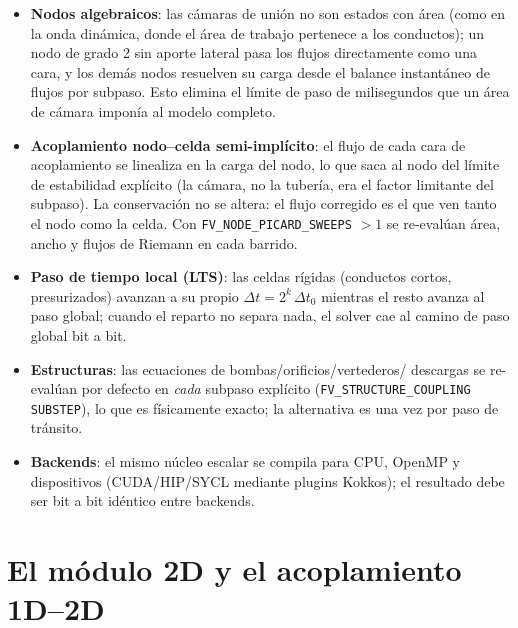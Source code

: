 \documentclass[11pt,a4paper]{article}
\begin{document}
\begin{itemize}[nosep]
  \item \textbf{Nodos algebraicos}: las cámaras de unión no son estados con
        área (como en la onda dinámica, donde el área de trabajo pertenece a
        los conductos); un nodo de grado 2 sin aporte lateral pasa los flujos
        directamente como una cara, y los demás nodos resuelven su carga desde
        el balance instantáneo de flujos por subpaso. Esto elimina el límite de
        paso de milisegundos que un área de cámara imponía al modelo completo.
  \item \textbf{Acoplamiento nodo--celda semi-implícito}: el flujo de cada cara
        de acoplamiento se linealiza en la carga del nodo, lo que saca al nodo
        del límite de estabilidad explícito (la cámara, no la tubería, era el
        factor limitante del subpaso). La conservación no se altera: el flujo
        corregido es el que ven tanto el nodo como la celda. Con
        \texttt{FV\_NODE\_PICARD\_SWEEPS} $> 1$ se re-evalúan área, ancho y
        flujos de Riemann en cada barrido.
  \item \textbf{Paso de tiempo local (LTS)}: las celdas rígidas (conductos
        cortos, presurizados) avanzan a su propio $\Delta t = 2^k\,\Delta t_0$
        mientras el resto avanza al paso global; cuando el reparto no separa
        nada, el solver cae al camino de paso global bit a bit.
  \item \textbf{Estructuras}: las ecuaciones de bombas/orificios/vertederos/
        descargas se re-evalúan por defecto en \emph{cada} subpaso explícito
        (\texttt{FV\_STRUCTURE\_COUPLING SUBSTEP}), lo que es físicamente
        exacto; la alternativa es una vez por paso de tránsito.
  \item \textbf{Backends}: el mismo núcleo escalar se compila para CPU,
        OpenMP y dispositivos (CUDA/HIP/SYCL mediante plugins Kokkos); el
        resultado debe ser bit a bit idéntico entre backends.
\end{itemize}

\section{El módulo 2D y el acoplamiento 1D--2D}
\label{sec:2d}
\end{document}
